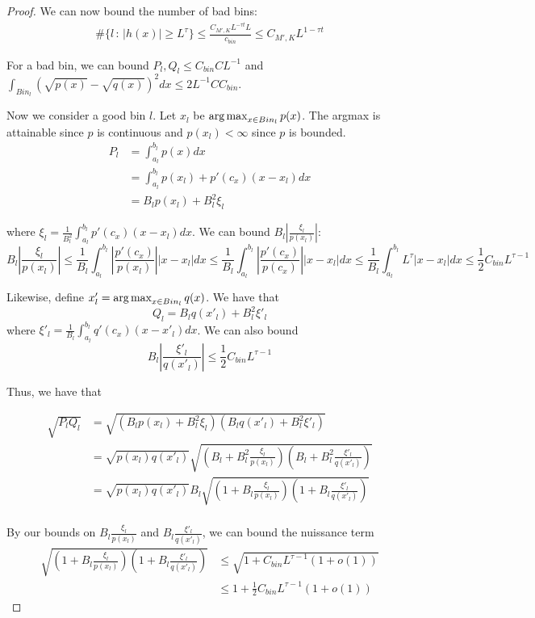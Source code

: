 \begin{proof}
We can now bound the number of bad bins: 
\begin{align*}
\# \{ l \,:\, |h(x)| \geq L^\tau \} \leq \frac{C_{M', K} L^{- \tau t} L}{c_{bin}}  \leq C_{M',K} L^{1 - \tau t}
\end{align*}


For a bad bin, we can bound $P_l, Q_l \leq C_{bin} C L^{-1}$ and $\int_{Bin_l} (\sqrt{p(x)} - \sqrt{q(x)})^2 dx \leq 2 L^{-1} C C_{bin} $.

Now we consider a good bin $l$. Let $x_l$ be $\mathop{\text{\rm arg\,max}}_{x \in Bin_l} p(x)$. The argmax is attainable since $p$ is continuous and $p(x_l) < \infty$ since $p$ is bounded.
\begin{align*}
P_l &= \int_{a_l}^{b_l} p(x) dx \\
   &= \int_{a_l}^{b_l} p(x_l) + p'(c_x)(x-x_l) dx \\
   &= B_l p(x_l) + B_l^2 \xi_l
\end{align*}

where $\xi_l = \frac{1}{B_l^2} \int_{a_l}^{b_l} p'(c_x)(x - x_l)dx$. We can bound $B_l \left| \frac{\xi_l}{p(x_l)} \right|$:
$$
B_l \left| \frac{\xi_l}{p(x_l)} \right| 
    \leq \frac{1}{B_l} \int_{a_l}^{b_l} \left|\frac{p'(c_x)}{p(x_l)} \right| |x - x_l| dx 
   \leq \frac{1}{B_l} \int_{a_l}^{b_l} \left|\frac{p'(c_x)}{p(c_x)} \right| |x - x_l| dx 
                \leq \frac{1}{B_l} \int_{a_l}^{b_l} L^{\tau} |x - x_l| dx \leq 
 \frac{1}{2} C_{bin} L^{\tau - 1} 
$$ 

Likewise, define $x'_l = \mathop{\text{\rm arg\,max}}_{x \in Bin_l} q(x)$. We have that
\[
Q_l = B_l q(x'_l) + B_l^2 \xi'_l
\]
where $\xi'_l = \frac{1}{B_l} \int_{a_l}^{b_l} q'(c_x) (x - x'_l) dx$. We can also bound 
\[
B_l \left| \frac{\xi'_l}{q(x'_l)} \right| \leq \frac{1}{2} C_{bin} L^{\tau - 1}
\]

Thus, we have that

\begin{align*}
 \sqrt{P_l Q_l} &= \sqrt{ (B_l p(x_l) + B_l^2 \xi_l) 
                           (B_l q(x'_l) + B_l^2 \xi'_l) } \\
    &= \sqrt{p(x_l) q(x'_l)} \sqrt{ (B_l + B_l^2 \frac{\xi_l}{p(x_l)} ) 
                                           (B_l + B_l^2 \frac{\xi'_l}{q(x'_l)} ) } \\
   &=  \sqrt{p(x_l) q(x'_l)} B_l \sqrt{ (1 + B_l \frac{\xi_l}{p(x_l)} ) 
                                           (1 + B_l \frac{\xi'_l}{q(x'_l)} ) } \\
\end{align*}

By our bounds on $ B_l \frac{\xi_l}{p(x_l)} $ and $B_l  \frac{\xi'_l}{q(x'_l)}$, we can bound the nuissance term 
\begin{align*}
 \sqrt{ (1 + B_l \frac{\xi_l}{p(x_l)} ) 
         (1 + B_l \frac{\xi'_l}{q(x'_l)} ) } &\leq \sqrt{ 1 + C_{bin} L^{\tau - 1} (1+o(1))} \\
   &\leq 1 + \frac{1}{2} C_{bin} L^{\tau - 1} (1 + o(1))
\end{align*}



\end{proof}
